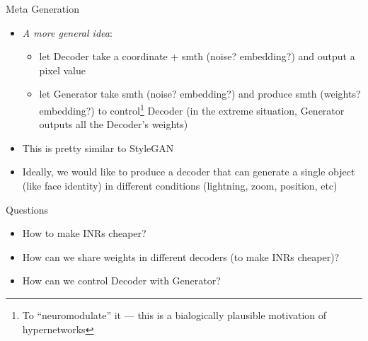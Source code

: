 \documentclass[10pt, handout]{beamer}
\begin{document}
\begin{frame}{Meta Generation}
    \begin{itemize}
        \item\pause \textit{A more general idea}:
        \begin{itemize}
            \item\pause let Decoder take a coordinate + smth (noise? embedding?) and output a pixel value
            \item\pause let Generator take smth (noise? embedding?) and produce smth (weights? embedding?) to control\footnote{To ``neuromodulate'' it --- this is a bialogically plausible motivation of hypernetworks} Decoder (in the extreme situation, Generator outputs all the Decoder's weights)
        \end{itemize}
        \item\pause This is pretty similar to StyleGAN
        \item\pause Ideally, we would like to produce a decoder that can generate a single object (like face identity) in different conditions (lightning, zoom, position, etc)
    \end{itemize}
\end{frame}





\begin{frame}{Questions}
    \begin{itemize}
        \item How to make INRs cheaper?
        \item How can we share weights in different decoders (to make INRs cheaper)?
        \item How can we control Decoder with Generator?
    \end{itemize}
\end{frame}
\end{document}
